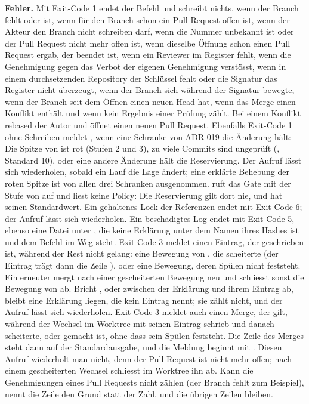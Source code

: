 {\bf Fehler.} Mit Exit-Code 1 endet der Befehl und schreibt nichts, wenn der Branch fehlt oder
 ist, wenn für den Branch schon ein Pull Request offen ist, wenn der Akteur den
Branch nicht schreiben darf, wenn die Nummer unbekannt ist oder der Pull Request nicht mehr offen
ist, wenn dieselbe Öffnung schon einen Pull Request ergab, der beendet ist,
wenn ein Reviewer im Register fehlt, wenn die Genehmigung gegen das Verbot der eigenen
Genehmigung verstösst, wenn in einem durchsetzenden Repository der Schlüssel fehlt oder die
Signatur das Register nicht überzeugt, wenn der Branch sich während der Signatur bewegte, wenn
der Branch seit dem Öffnen einen neuen Head hat, wenn das Merge einen Konflikt enthält und wenn
kein Ergebnis einer Prüfung zählt. Bei einem Konflikt rebased der Autor und öffnet einen neuen
Pull Request.
Ebenfalls Exit-Code 1 ohne Schreiben meldet , wenn eine Schranke von ADR-019 die
Änderung hält: Die Spitze von  ist rot (Stufen 2 und 3), zu viele Commits sind
ungeprüft (, Standard 10), oder eine andere Änderung hält die Reservierung.
Der Aufruf lässt sich wiederholen, sobald ein Lauf die Lage ändert; eine erklärte Behebung der
roten Spitze ist von allen drei Schranken ausgenommen.
 ruft das Gate mit der Stufe von  auf und liest keine Policy:
Die Reservierung gilt dort nie, und  hat seinen Standardwert.
Ein gehaltenes Lock der Referenzen endet mit Exit-Code 6; der Aufruf lässt sich
wiederholen. Ein beschädigtes Log endet mit Exit-Code 5, ebenso eine Datei unter
, die keine Erklärung unter dem Namen ihres Hashes ist und dem Befehl
im Weg steht. Exit-Code 3 meldet einen Eintrag, der
geschrieben ist, während der Rest nicht gelang: eine Bewegung
von , die scheiterte (der Eintrag trägt dann die Zeile
), oder eine Bewegung, deren Spülen nicht feststeht.
Ein erneuter  mergt nach einer gescheiterten Bewegung neu und schliesst
sonst die Bewegung von  ab.
Bricht ,  oder  zwischen der Erklärung und ihrem Eintrag
ab, bleibt eine Erklärung liegen, die kein Eintrag nennt; sie zählt nicht, und der Aufruf lässt
sich wiederholen.
Exit-Code 3 meldet auch einen Merge, der gilt, während der Wechsel im Worktree mit 
seinen Eintrag schrieb und danach scheiterte, oder gemacht ist, ohne dass sein Spülen feststeht.
Die Zeile des Merges steht dann auf der Standardausgabe,
und die Meldung beginnt mit .
Diesen Aufruf wiederholt man nicht, denn der Pull Request ist nicht mehr offen;
nach einem gescheiterten Wechsel schliesst  im Worktree ihn ab.
Kann  die Genehmigungen eines Pull Requests nicht zählen (der Branch fehlt zum
Beispiel), nennt die Zeile den Grund statt der Zahl, und die übrigen Zeilen bleiben.

